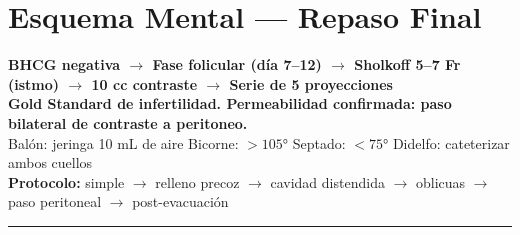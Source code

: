 \section*{Esquema Mental --- Repaso Final}

\begin{cajakeypoints}
\begin{center}
\textbf{\color{azulprincipal}
  BHCG negativa $\rightarrow$ Fase folicular (día 7--12) $\rightarrow$ Sholkoff 5--7 Fr (istmo) $\rightarrow$ 10 cc contraste $\rightarrow$ Serie de 5 proyecciones}\\[0.4em]
\textbf{\color{naranjadestacado}
  Gold Standard de infertilidad. Permeabilidad confirmada: paso bilateral de contraste a peritoneo.}\\[0.3em]
Balón: jeringa 10 mL de aire \quad Bicorne: $>105°$ \quad Septado: $<75°$ \quad Didelfo: cateterizar ambos cuellos\\[0.3em]
\textbf{Protocolo:} simple $\to$ relleno precoz $\to$ cavidad distendida $\to$ oblicuas $\to$ paso peritoneal $\to$ post-evacuación
\end{center}
\end{cajakeypoints}

\vspace{1em}
\hrule
\vspace{0.5em}
